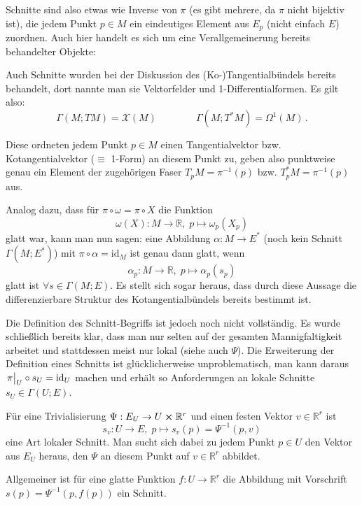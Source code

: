 \documentclass[../H_Analysis_main.tex]{subfiles}
\begin{document}
Schnitte sind also etwas wie Inverse von $\pi$ (es gibt mehrere, da $\pi$ nicht bijektiv ist), die jedem Punkt $p \in M$ ein eindeutiges Element aus $E_p$ (nicht einfach $E$) zuordnen. Auch hier handelt es sich um eine Verallgemeinerung bereits behandelter Objekte:

\begin{bsp}\label{bsp:bekschnitt}
Auch Schnitte wurden bei der Diskussion des (Ko-)Tangentialbündels bereits behandelt, dort nannte man sie Vektorfelder und 1-Differentialformen. Es gilt also:
\begin{equation}\label{eq:schnittbsp}
\Gamma(M; TM) = \mathcal{X}(M) \qquad  \qquad \Gamma(M; T^*M) = \Omega^1(M) \, .
\end{equation}

Diese ordneten jedem Punkt $p \in M$ einen Tangentialvektor bzw. Kotangentialvektor ($\equiv$ 1-Form) an diesem Punkt zu, geben also punktweise genau ein Element der zugehörigen Faser $T_p M = \pi^{-1}(p)$ bzw. $T_p^* M = \pi^{-1}(p)$ aus.
\end{bsp}

Analog dazu, dass für $\pi \circ \omega = \pi \circ X$ die Funktion
\begin{equation}
\omega(X): M \rightarrow \mathbb{R}, \; p \mapsto \omega_p(X_p)
\end{equation}
glatt war, kann man nun sagen: eine Abbildung $\alpha: M \rightarrow E^*$ (noch kein Schnitt $\Gamma(M; E^*)$) mit $\pi \circ \alpha = \text{id}_M$ ist genau dann glatt, wenn
\begin{equation}
\alpha_p: M \rightarrow \mathbb{R}, \; p \mapsto \alpha_p(s_p)
\end{equation}
glatt ist $\forall s \in \Gamma(M; E)$. Es stellt sich sogar heraus, dass durch diese Aussage die differenzierbare Struktur des Kotangentialbündels bereits bestimmt ist.


Die Definition des Schnitt-Begriffs ist jedoch noch nicht vollständig. Es wurde schließlich bereits klar, dass man nur selten auf der gesamten Mannigfaltigkeit arbeitet und stattdessen meist nur lokal (siehe auch $\Psi$). Die Erweiterung der Definition eines Schnitts ist glücklicherweise unproblematisch, man kann daraus $\eval{\pi}_U \circ s_U = \text{id}_U$ machen und erhält so Anforderungen an lokale Schnitte $s_U \in \Gamma(U; E)$.


\begin{bsp}
Für eine Trivialisierung $\Psi: E_U \rightarrow U \cross \mathbb{R}^r$ und einen festen Vektor $v \in \mathbb{R}^r$ ist
\begin{equation*}
s_v: U \rightarrow E, \; p \mapsto s_v(p) = \Psi^{-1}(p, v)
\end{equation*}
eine Art lokaler Schnitt. Man sucht sich dabei zu jedem Punkt $p \in U$ den Vektor aus $E_U$ heraus, den $\Psi$ an diesem Punkt auf $v \in \mathbb{R}^r$ abbildet.

Allgemeiner ist für eine glatte Funktion $f: U \rightarrow \mathbb{R}^r$ die Abbildung mit Vorschrift $s(p) = \Psi^{-1}(p, f(p))$ ein Schnitt.
\end{bsp}
\end{document}
